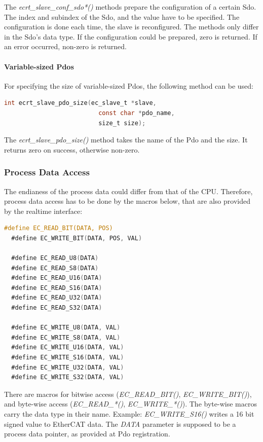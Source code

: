\documentclass[a4paper,12pt,BCOR6mm,bibtotoc,idxtotoc]{scrbook}
\begin{document}
The \textit{ecrt\_slave\_conf\_sdo*()} methods prepare the configuration of a
certain Sdo. The index and subindex of the Sdo, and the value have to be
specified. The configuration is done each time, the slave is reconfigured. The
methods only differ in the Sdo's data type. If the configuration could be
prepared, zero is returned. If an error occurred, non-zero is returned.

\paragraph{Variable-sized Pdos}

For specifying the size of variable-sized Pdos, the following method
can be used:

\begin{lstlisting}[gobble=2,language=C]
  int ecrt_slave_pdo_size(ec_slave_t *slave,
                          const char *pdo_name,
                          size_t size);
\end{lstlisting}

The \textit{ecrt\_slave\_pdo\_size()} method takes the name of the Pdo
and the size. It returns zero on success, otherwise non-zero.

\subsubsection{Process Data Access}
\label{sec:macros}

The endianess of the process data could differ from that of the CPU.
Therefore, process data access has to be done by the macros below,
that are also provided by the realtime interface:

\begin{lstlisting}[gobble=2,language=C]
  #define EC_READ_BIT(DATA, POS)
  #define EC_WRITE_BIT(DATA, POS, VAL)

  #define EC_READ_U8(DATA)
  #define EC_READ_S8(DATA)
  #define EC_READ_U16(DATA)
  #define EC_READ_S16(DATA)
  #define EC_READ_U32(DATA)
  #define EC_READ_S32(DATA)

  #define EC_WRITE_U8(DATA, VAL)
  #define EC_WRITE_S8(DATA, VAL)
  #define EC_WRITE_U16(DATA, VAL)
  #define EC_WRITE_S16(DATA, VAL)
  #define EC_WRITE_U32(DATA, VAL)
  #define EC_WRITE_S32(DATA, VAL)
\end{lstlisting}

There are macros for bitwise access (\textit{EC\_READ\_BIT()},
\textit{EC\_WRITE\_BIT()}), and byte-wise access (\textit{EC\_READ\_*()},
\textit{EC\_WRITE\_*()}). The byte-wise macros carry the data type in their
name. Example: \textit{EC\_WRITE\_S16()} writes a 16 bit signed value to
EtherCAT data. The \textit{DATA} parameter is supposed to be a process data
pointer, as provided at Pdo registration.
\end{document}
